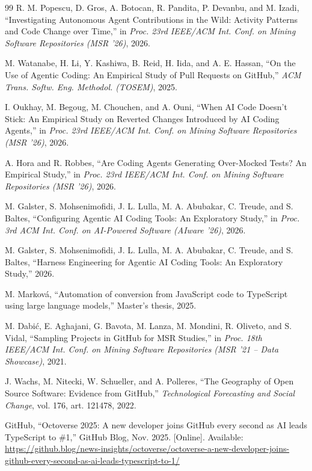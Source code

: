 \documentclass[11pt,a4paper]{article}
\begin{document}
\begin{thebibliography}{99}
R. M. Popescu, D. Gros, A. Botocan, R. Pandita, P. Devanbu, and M. Izadi,
``Investigating Autonomous Agent Contributions in the Wild: Activity Patterns and Code Change over Time,''
in \textit{Proc. 23rd IEEE/ACM Int. Conf. on Mining Software Repositories (MSR '26)}, 2026.

M. Watanabe, H. Li, Y. Kashiwa, B. Reid, H. Iida, and A. E. Hassan,
``On the Use of Agentic Coding: An Empirical Study of Pull Requests on GitHub,''
\textit{ACM Trans. Softw. Eng. Methodol. (TOSEM)}, 2025.

I. Oukhay, M. Begoug, M. Chouchen, and A. Ouni,
``When AI Code Doesn't Stick: An Empirical Study on Reverted Changes Introduced by AI Coding Agents,''
in \textit{Proc. 23rd IEEE/ACM Int. Conf. on Mining Software Repositories (MSR '26)}, 2026.

A. Hora and R. Robbes,
``Are Coding Agents Generating Over-Mocked Tests? An Empirical Study,''
in \textit{Proc. 23rd IEEE/ACM Int. Conf. on Mining Software Repositories (MSR '26)}, 2026.

M. Galster, S. Mohsenimofidi, J. L. Lulla, M. A. Abubakar, C. Treude, and S. Baltes,
``Configuring Agentic AI Coding Tools: An Exploratory Study,''
in \textit{Proc. 3rd ACM Int. Conf. on AI-Powered Software (AIware '26)}, 2026.

M. Galster, S. Mohsenimofidi, J. L. Lulla, M. A. Abubakar, C. Treude, and S. Baltes,
``Harness Engineering for Agentic AI Coding Tools: An Exploratory Study,'' 2026.

M. Markov\'{a},
``Automation of conversion from JavaScript code to TypeScript using large language models,''
Master's thesis, 2025.

M. Dabi\'{c}, E. Aghajani, G. Bavota, M. Lanza, M. Mondini, R. Oliveto, and S. Vidal,
``Sampling Projects in GitHub for MSR Studies,''
in \textit{Proc. 18th IEEE/ACM Int. Conf. on Mining Software Repositories (MSR '21 -- Data Showcase)}, 2021.

J. Wachs, M. Nitecki, W. Schueller, and A. Polleres,
``The Geography of Open Source Software: Evidence from GitHub,''
\textit{Technological Forecasting and Social Change}, vol. 176, art. 121478, 2022.

GitHub,
``Octoverse 2025: A new developer joins GitHub every second as AI leads TypeScript to \#1,''
GitHub Blog, Nov. 2025.
[Online]. Available: \url{https://github.blog/news-insights/octoverse/octoverse-a-new-developer-joins-github-every-second-as-ai-leads-typescript-to-1/}

\end{thebibliography}
\end{document}
